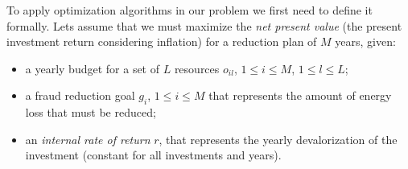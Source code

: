 %

To apply optimization algorithms in our problem we first need to define it formally. Lets assume
that we must maximize the \textit{net present value} (the present investment return considering 
inflation) for a reduction plan of $M$ years, given:

\begin{itemize}
    \item a yearly budget for a set of $L$ resources $o_{il}$, $1 \le i \le M$, $1 \le l \le L$;
    
    \item a fraud reduction goal $g_i$, $1 \le i \le M$ that represents the
    amount of energy loss that must be reduced;

    \item an \textit{internal rate of return} $r$, that represents the yearly devalorization of the investment
    (constant for all investments and years). 

\end{itemize}

